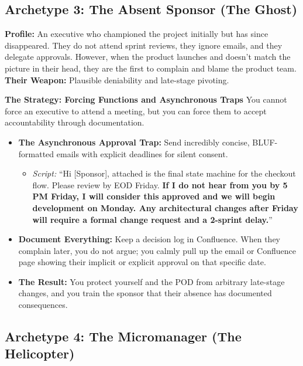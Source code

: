 \subsection{Archetype 3: The Absent Sponsor (The
Ghost)}\label{archetype-3-the-absent-sponsor-the-ghost}

\textbf{Profile:} An executive who championed the project initially but
has since disappeared. They do not attend sprint reviews, they ignore
emails, and they delegate approvals. However, when the product launches
and doesn't match the picture in their head, they are the first to
complain and blame the product team. \textbf{Their Weapon:} Plausible
deniability and late-stage pivoting.

\textbf{The Strategy: Forcing Functions and Asynchronous Traps} You
cannot force an executive to attend a meeting, but you can force them to
accept accountability through documentation.

\begin{itemize}
\tightlist
\item
  \textbf{The Asynchronous Approval Trap:} Send incredibly concise,
  BLUF-formatted emails with explicit deadlines for silent consent.

  \begin{itemize}
  \tightlist
  \item
    \emph{Script:} ``Hi {[}Sponsor{]}, attached is the final state
    machine for the checkout flow. Please review by EOD Friday.
    \textbf{If I do not hear from you by 5 PM Friday, I will consider
    this approved and we will begin development on Monday. Any
    architectural changes after Friday will require a formal change
    request and a 2-sprint delay.}''
  \end{itemize}
\item
  \textbf{Document Everything:} Keep a decision log in Confluence. When
  they complain later, you do not argue; you calmly pull up the email or
  Confluence page showing their implicit or explicit approval on that
  specific date.
\item
  \textbf{The Result:} You protect yourself and the POD from arbitrary
  late-stage changes, and you train the sponsor that their absence has
  documented consequences.
\end{itemize}

\subsection{Archetype 4: The Micromanager (The
Helicopter)}\label{archetype-4-the-micromanager-the-helicopter}

